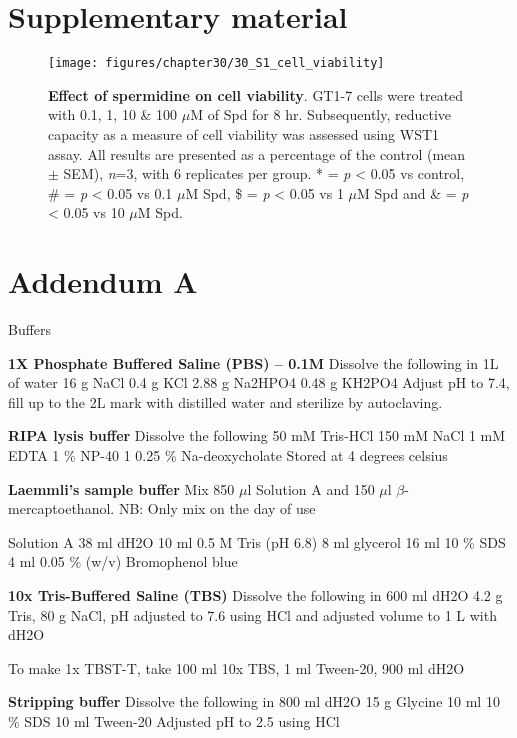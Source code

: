 \chapter*{Supplementary material}

\begin{figure}[!htbp]
  \center
    \texttt{[image: figures/chapter30/30\_S1\_cell\_viability]}
  	\caption[Effect of spermidine on cell viability]{\textbf{Effect of spermidine on cell viability}. GT1-7 cells were treated with 0.1, 1, 10 \& 100 $\mu$M of Spd for 8 hr. Subsequently, reductive capacity as a measure of cell viability was assessed using WST1 assay. All results are presented as a percentage of the control (mean $\pm$ SEM), \textit{n}=3, with 6 replicates per group. * = \textit{p} < 0.05 vs control, \# = \textit{p} < 0.05 vs 0.1 $\mu$M Spd, \$ = \textit{p} < 0.05 vs 1 $\mu$M Spd and \& = \textit{p} < 0.05 vs 10 $\mu$M Spd.}
  \label{fig:30_S1_cell_viability}
\end{figure}

\chapter*{Addendum A}

Buffers

\textbf{1X Phosphate Buffered Saline (PBS) – 0.1M}
Dissolve the following in 1L of water 
16 g NaCl 
0.4 g KCl 
2.88 g Na2HPO4 
0.48 g KH2PO4 
Adjust pH to 7.4, fill up to the 2L mark with distilled water and sterilize by autoclaving.

\textbf{RIPA lysis buffer}
Dissolve the following
50 mM Tris-HCl
150 mM NaCl 
1 mM EDTA 
1 \% NP-40 1
0.25 \% Na-deoxycholate 
Stored at 4 degrees celsius

\textbf{Laemmli’s sample buffer}
Mix 850 $\mu$l Solution A and 150 $\mu$l $\beta$-mercaptoethanol. NB: Only mix on the day of use

Solution A 
38 ml dH2O
10 ml 0.5 M Tris (pH 6.8)
8 ml glycerol
16 ml 10 \% SDS
4 ml 0.05 \% (w/v) Bromophenol blue

\textbf{10x Tris-Buffered Saline (TBS)}
Dissolve the following in 600 ml dH2O
4.2 g Tris, 
80 g NaCl,   
pH adjusted to 7.6 using HCl and adjusted  volume to 1 L with dH2O

To make  1x TBST-T, take
100 ml 10x TBS, 
1 ml Tween-20, 
900 ml dH2O

\textbf{Stripping buffer}
Dissolve the following in 800 ml dH2O
15 g Glycine
 10 ml 10 \% SDS 
 10 ml Tween-20
 Adjusted pH  to 2.5 using HCl
 
